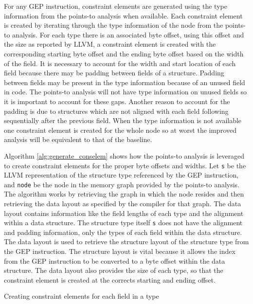 \documentclass[11pt,a4paper]{article}
\begin{document}
For any GEP instruction, constraint elements are generated using the type
information from the points-to analysis when available. Each constraint element
is created by iterating through the type information of the node from the
points-to analysis. For each type there is an associated byte offset, using this
offset and the size as reported by LLVM, a constraint element is created with
the corresponding starting byte offset and the ending byte offset based on the
width of the field. It is necessary to account for the width and start location
of each field because there may be padding between fields of a structure.
Padding between fields may be present in the type information because of an
unused field in code. The points-to analysis will not have type information on
unused fields so it is important to account for these gaps. Another reason to
account for the padding is due to structures which are not aligned with each
field following sequentially after the previous field. When the type information
is not available one constraint element is created for the whole node so at
worst the improved analysis will be equivalent to that of the baseline.

Algorithm \ref{alg:generate_conselem} shows how the points-to analysis is
leveraged to create constraint elements for the proper byte offsets and widths.
Let \texttt{s} be the LLVM representation of the structure type referenced by
the GEP instruction, and \texttt{node} be the node in the memory graph provided
by the points-to analysis. The algorithm works by retrieving the graph in which
the node resides and then retrieving the data layout as specified by the
compiler for that graph. The data layout contains information like the field
lengths of each type and the alignment within a data structure. The structure
type itself \texttt{s} does not have the alignment and padding information, only
the types of each field within the data structure. The data layout is used to
retrieve the structure layout of the structure type from the GEP instruction.
The structure layout is vital because it allows the index from the GEP
instruction to be converted to a byte offset within the data structure. The
data layout also provides the size of each type, so that the constraint element
is created at the corrects starting and ending offset.
\begin{algorithm}
  \caption{Creating constraint elements for each field in a type}
  \label{alg:generate_conselem}
  
\end{algorithm}
\end{document}
